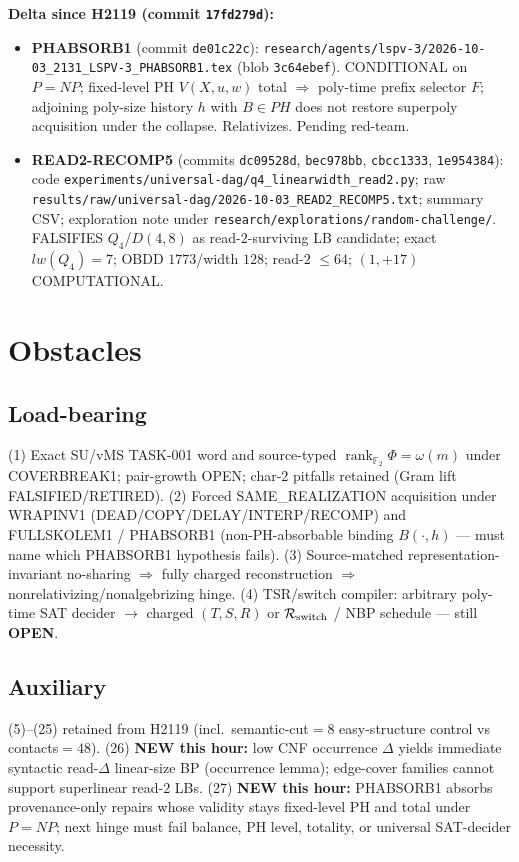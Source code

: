 \documentclass[11pt]{article}
\begin{document}
\textbf{Delta since H2119 (commit \texttt{17fd279d}):}
\begin{itemize}
\item \textbf{PHABSORB1} (commit \texttt{de01c22c}):
  \texttt{research/agents/lspv-3/2026-10-03\_2131\_LSPV-3\_PHABSORB1.tex}
  (blob \texttt{3c64ebef}). CONDITIONAL on $P=NP$; fixed-level PH $V(X,u,w)$ total
  $\Rightarrow$ poly-time prefix selector $F$; adjoining poly-size history $h$ with $B\in PH$
  does not restore superpoly acquisition under the collapse. Relativizes. Pending red-team.
\item \textbf{READ2-RECOMP5} (commits \texttt{dc09528d}, \texttt{bec978bb}, \texttt{cbcc1333},
  \texttt{1e954384}): code
  \texttt{experiments/universal-dag/q4\_linearwidth\_read2.py}; raw
  \texttt{results/raw/universal-dag/2026-10-03\_READ2\_RECOMP5.txt}; summary CSV;
  exploration note under \texttt{research/explorations/random-challenge/}.
  FALSIFIES $Q_4$/$D(4,8)$ as read-$2$-surviving LB candidate; exact $lw(Q_4)=7$;
  OBDD $1773$/width $128$; read-$2$ $\le64$; $(1,+17)$ COMPUTATIONAL.
\end{itemize}

\section*{Obstacles}
\subsection*{Load-bearing}
(1) Exact SU/vMS TASK-001 word and source-typed
$\operatorname{rank}_{\mathbb F_2}\Phi=\omega(m)$ under COVERBREAK1; pair-growth OPEN;
char-$2$ pitfalls retained (Gram lift FALSIFIED/RETIRED).
(2) Forced SAME\_REALIZATION acquisition under WRAPINV1
(DEAD/COPY/DELAY/INTERP/RECOMP) and FULLSKOLEM1 / PHABSORB1
(non-PH-absorbable binding $B(\cdot,h)$ --- must name which PHABSORB1 hypothesis fails).
(3) Source-matched representation-invariant no-sharing $\Rightarrow$ fully charged reconstruction
$\Rightarrow$ nonrelativizing/nonalgebrizing hinge.
(4) TSR/switch compiler: arbitrary poly-time SAT decider $\to$ charged $(T,S,R)$ or
$\mathcal R_{\rm switch}$ / NBP schedule --- still \textbf{OPEN}.

\subsection*{Auxiliary}
(5)--(25) retained from H2119 (incl.\ semantic-cut$=8$ easy-structure control vs contacts$=48$).
(26) \textbf{NEW this hour:} low CNF occurrence $\Delta$ yields immediate syntactic read-$\Delta$
linear-size BP (occurrence lemma); edge-cover families cannot support superlinear read-$2$ LBs.
(27) \textbf{NEW this hour:} PHABSORB1 absorbs provenance-only repairs whose validity stays
fixed-level PH and total under $P=NP$; next hinge must fail balance, PH level, totality, or
universal SAT-decider necessity.
\end{document}
